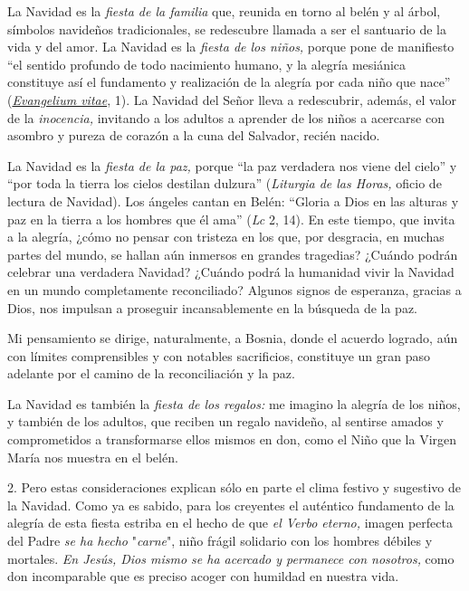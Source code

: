 La Navidad es la \emph{fiesta de la familia} que, reunida en torno al
belén y al árbol, símbolos navideños tradicionales, se redescubre
llamada a ser el santuario de la vida y del amor. La Navidad es la
\emph{fiesta de los niños,} porque pone de manifiesto ``el sentido
profundo de todo nacimiento humano, y la alegría mesiánica constituye
así el fundamento y realización de la alegría por cada niño que nace''
(\emph{\href{http://w2.vatican.va/content/john-paul-ii/es/encyclicals/documents/hf_jp-ii_enc_25031995_evangelium-vitae.html}{Evangelium
		vitae}}, 1). La Navidad del Señor lleva a redescubrir, además, el valor
de la \emph{inocencia,} invitando a los adultos a aprender de los niños
a acercarse con asombro y pureza de corazón a la cuna del Salvador,
recién nacido.

La Navidad es la \emph{fiesta de la paz,} porque ``la paz verdadera nos
viene del cielo'' y ``por toda la tierra los cielos destilan dulzura''
(\emph{Liturgia de las Horas,} oficio de lectura de Navidad). Los
ángeles cantan en Belén: ``Gloria a Dios en las alturas y paz en la
tierra a los hombres que él ama'' (\emph{Lc} 2, 14). En este tiempo, que
invita a la alegría, ¿cómo no pensar con tristeza en los que, por
desgracia, en muchas partes del mundo, se hallan aún inmersos en grandes
tragedias? ¿Cuándo podrán celebrar una verdadera Navidad? ¿Cuándo podrá
la humanidad vivir la Navidad en un mundo completamente reconciliado?
Algunos signos de esperanza, gracias a Dios, nos impulsan a proseguir
incansablemente en la búsqueda de la paz.

Mi pensamiento se dirige, naturalmente, a Bosnia, donde el acuerdo
logrado, aún con límites comprensibles y con notables sacrificios,
constituye un gran paso adelante por el camino de la reconciliación y la
paz.

La Navidad es también la \emph{fiesta de los regalos:} me imagino la
alegría de los niños, y también de los adultos, que reciben un regalo
navideño, al sentirse amados y comprometidos a transformarse ellos
mismos en don, como el Niño que la Virgen María nos muestra en el belén.

2. Pero estas consideraciones explican sólo en parte el clima festivo y
sugestivo de la Navidad. Como ya es sabido, para los creyentes el
auténtico fundamento de la alegría de esta fiesta estriba en el hecho de
que \emph{el Verbo eterno,} imagen perfecta del Padre \emph{se ha hecho}
"\emph{carne}", niño frágil solidario con los hombres débiles y
mortales. \emph{En Jesús, Dios mismo se ha acercado y permanece con
	nosotros,} como don incomparable que es preciso acoger con humildad en
nuestra vida.

